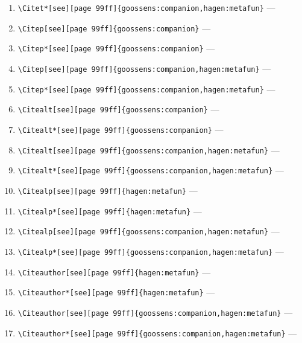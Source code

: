 \documentclass[12pt]{article}
\begin{document}
\begin{enumerate}
\item
\verb|\Citet*[see][page 99ff]{goossens:companion,hagen:metafun}| ---
\item
\verb|\Citep[see][page 99ff]{goossens:companion}| ---
\item
\verb|\Citep*[see][page 99ff]{goossens:companion}| ---
\item
\verb|\Citep[see][page 99ff]{goossens:companion,hagen:metafun}| ---
\item
\verb|\Citep*[see][page 99ff]{goossens:companion,hagen:metafun}| ---
\item
\verb|\Citealt[see][page 99ff]{goossens:companion}| ---
\item
\verb|\Citealt*[see][page 99ff]{goossens:companion}| ---
\item
\verb|\Citealt[see][page 99ff]{goossens:companion,hagen:metafun}| ---
\item
\verb|\Citealt*[see][page 99ff]{goossens:companion,hagen:metafun}| ---
\item
\verb|\Citealp[see][page 99ff]{hagen:metafun}| ---
\item
\verb|\Citealp*[see][page 99ff]{hagen:metafun}| ---
\item
\verb|\Citealp[see][page 99ff]{goossens:companion,hagen:metafun}| ---
\item
\verb|\Citealp*[see][page 99ff]{goossens:companion,hagen:metafun}| ---
\item
\verb|\Citeauthor[see][page 99ff]{hagen:metafun}| ---
\item
\verb|\Citeauthor*[see][page 99ff]{hagen:metafun}| ---
\item
\verb|\Citeauthor[see][page 99ff]{goossens:companion,hagen:metafun}| ---
\item
\verb|\Citeauthor*[see][page 99ff]{goossens:companion,hagen:metafun}| ---
\end{enumerate}
\end{document}
